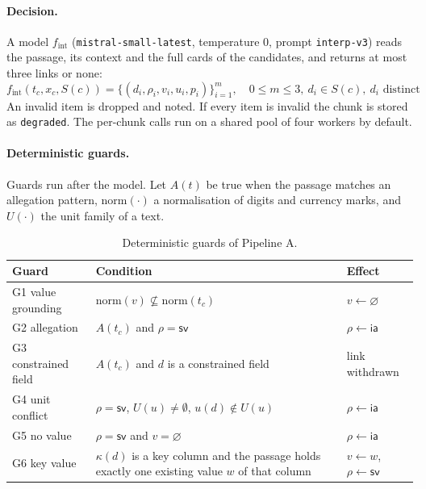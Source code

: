 \documentclass[11pt,a4paper]{article}
\newcommand{\sv}{\mathsf{sv}}
\newcommand{\ia}{\mathsf{ia}}
\begin{document}


\paragraph{Decision.}
A model $f_{\mathrm{int}}$ (\texttt{mistral-small-latest}, temperature 0, prompt \texttt{interp-v3}) reads the passage, its context and the full cards of the candidates, and returns at most three links or none:
\begin{equation}
f_{\mathrm{int}}(t_c, x_c, S(c)) = \big\{(d_i, \rho_i, v_i, u_i, p_i)\big\}_{i=1}^{m},\quad 0 \le m \le 3,\ d_i \in S(c),\ d_i \text{ distinct}
\end{equation}
An invalid item is dropped and noted. If every item is invalid the chunk is stored as \texttt{degraded}. The per-chunk calls run on a shared pool of four workers by default. %

\paragraph{Deterministic guards.}
Guards run after the model. Let $A(t)$ be true when the passage matches an allegation pattern, $\mathrm{norm}(\cdot)$ a normalisation of digits and currency marks, and $U(\cdot)$ the unit family of a text.

\begin{table}[H]
\centering\small
\caption{Deterministic guards of Pipeline A.}
\label{tab:guards}
\begin{tabular}{lp{6.2cm}l}
\toprule
Guard & Condition & Effect\\\midrule
G1 value grounding & $\mathrm{norm}(v) \not\subseteq \mathrm{norm}(t_c)$ & $v \leftarrow \varnothing$\\
G2 allegation & $A(t_c)$ and $\rho = \sv$ & $\rho \leftarrow \ia$\\
G3 constrained field & $A(t_c)$ and $d$ is a constrained field & link withdrawn\\
G4 unit conflict & $\rho=\sv$, $U(u)\neq\emptyset$, $u(d) \notin U(u)$ & $\rho \leftarrow \ia$\\
G5 no value & $\rho=\sv$ and $v=\varnothing$ & $\rho \leftarrow \ia$\\
G6 key value & $\kappa(d)$ is a key column and the passage holds exactly one existing value $w$ of that column & $v \leftarrow w$, $\rho \leftarrow \sv$\\
\bottomrule
\end{tabular}
\end{table}
\end{document}
